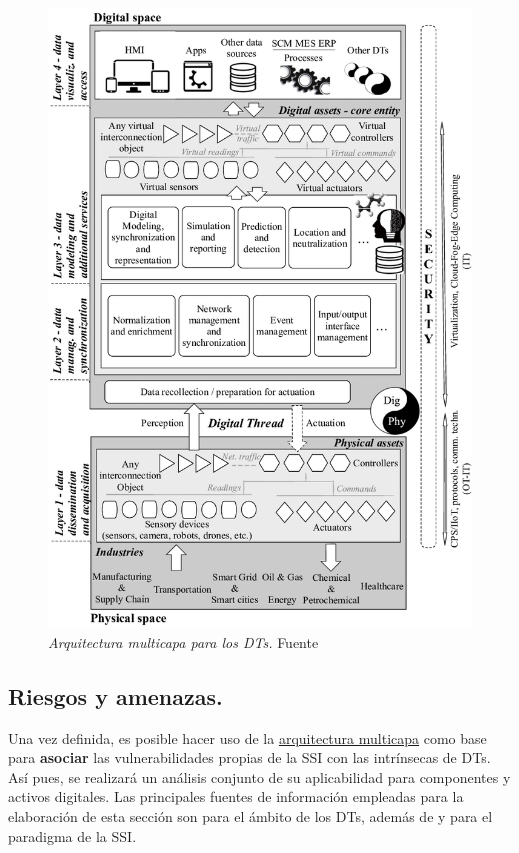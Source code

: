 \documentclass[../main.tex]{subfiles}
\begin{document}
\begin{figure}[htbp]
    \centering
    \includegraphics[width=0.8\linewidth]{images/DT_Layers.png}
    \caption{\textit{Arquitectura multicapa para los \acrshort{DT}s.} Fuente \cite{ThreatsDT}}
    \label{fig:capas}
\end{figure}


\newpage
\subsection{Riesgos y amenazas.}\label{Riesgos y amenazas} 
Una vez definida, es posible hacer uso de la \hyperref[Arquitectura multicapa]{arquitectura multicapa} como base para \textbf{asociar} las vulnerabilidades propias de la \acrshort{SSI} con las intrínsecas de \acrshort{DT}s. Así pues, se realizará un análisis conjunto de su aplicabilidad para componentes y activos digitales. Las principales fuentes de información empleadas para la elaboración de esta sección son \cite{ThreatsDT} para el ámbito de los \acrshort{DT}s, además de \cite{ChallengesSSI} y \cite{ThreatModeling} para el paradigma de la \acrshort{SSI}. 
\end{document}

